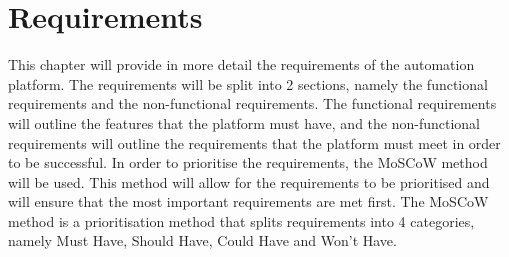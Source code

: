 \chapter{Requirements}
\label{chap:requirements}
This chapter will provide in more detail the requirements of the automation
platform. The requirements will be split into 2 sections, namely the functional
requirements and the non-functional requirements. The functional requirements
will outline the features that the platform must have, and the non-functional
requirements will outline the requirements that the platform must meet in order
to be successful.
In order to prioritise the requirements, the MoSCoW method will be used. This
method will allow for the requirements to be prioritised and will ensure that
the most important requirements are met first. The MoSCoW method is a
prioritisation method that splits requirements into 4 categories, namely Must
Have, Should Have, Could Have and Won’t Have.
